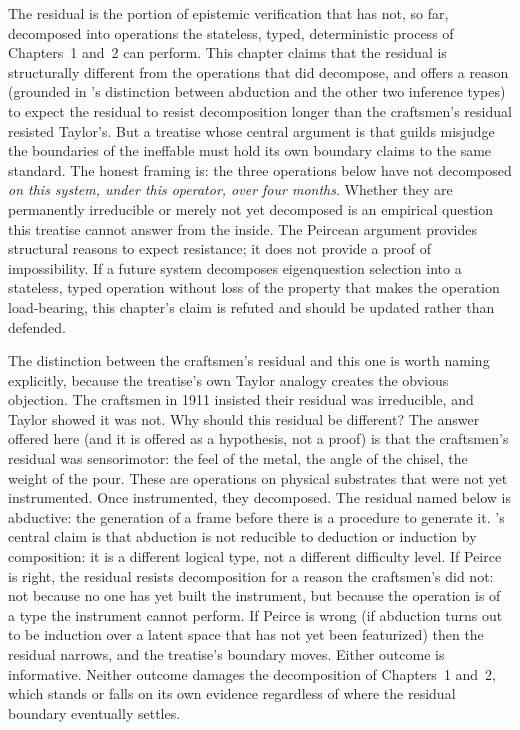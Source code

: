 \documentclass[11pt]{article}
\begin{document}
The residual is the portion of epistemic verification that has not, so far, decomposed into operations the stateless, typed, deterministic process of Chapters~1 and~2 can perform. This chapter claims that the residual is structurally different from the operations that did decompose, and offers a reason (grounded in \citeauthor{peirce1878}'s distinction between abduction and the other two inference types) to expect the residual to resist decomposition longer than the craftsmen's residual resisted Taylor's. But a treatise whose central argument is that guilds misjudge the boundaries of the ineffable must hold its own boundary claims to the same standard. The honest framing is: the three operations below have not decomposed \emph{on this system, under this operator, over four months}. Whether they are permanently irreducible or merely not yet decomposed is an empirical question this treatise cannot answer from the inside. The Peircean argument provides structural reasons to expect resistance; it does not provide a proof of impossibility. If a future system decomposes eigenquestion selection into a stateless, typed operation without loss of the property that makes the operation load-bearing, this chapter's claim is refuted and should be updated rather than defended.

The distinction between the craftsmen's residual and this one is worth naming explicitly, because the treatise's own Taylor analogy creates the obvious objection. The craftsmen in 1911 insisted their residual was irreducible, and Taylor showed it was not. Why should this residual be different? The answer offered here (and it is offered as a hypothesis, not a proof) is that the craftsmen's residual was sensorimotor: the feel of the metal, the angle of the chisel, the weight of the pour. These are operations on physical substrates that were not yet instrumented. Once instrumented, they decomposed. The residual named below is abductive: the generation of a frame before there is a procedure to generate it. \citeauthor{peirce1878}'s central claim is that abduction is not reducible to deduction or induction by composition: it is a different logical type, not a different difficulty level. If Peirce is right, the residual resists decomposition for a reason the craftsmen's did not: not because no one has yet built the instrument, but because the operation is of a type the instrument cannot perform. If Peirce is wrong (if abduction turns out to be induction over a latent space that has not yet been featurized) then the residual narrows, and the treatise's boundary moves. Either outcome is informative. Neither outcome damages the decomposition of Chapters~1 and~2, which stands or falls on its own evidence regardless of where the residual boundary eventually settles.
\end{document}
